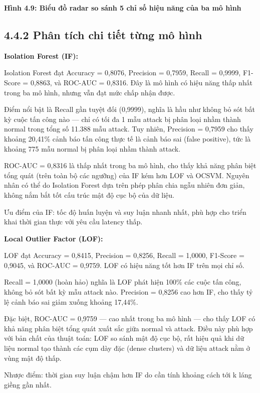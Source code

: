 \documentclass[
  a4paper]{report}
\begin{document}
\textbf{Hình 4.9: Biểu đồ radar so sánh 5 chỉ số hiệu năng của ba mô
hình}

\subsection{4.4.2 Phân tích chi tiết từng mô
hình}\label{phuxe2n-tuxedch-chi-tiux1ebft-tux1eebng-muxf4-huxecnh}

\textbf{Isolation Forest (IF):}

Isolation Forest đạt Accuracy = 0,8076, Precision = 0,7959, Recall =
0,9999, F1-Score = 0,8863, và ROC-AUC = 0,8316. Đây là mô hình có hiệu
năng thấp nhất trong ba mô hình, nhưng vẫn đạt mức chấp nhận được.

Điểm nổi bật là Recall gần tuyệt đối (0,9999), nghĩa là hầu như không bỏ
sót bất kỳ cuộc tấn công nào --- chỉ có tối đa 1 mẫu attack bị phân loại
nhầm thành normal trong tổng số 11.388 mẫu attack. Tuy nhiên, Precision
= 0,7959 cho thấy khoảng 20,41\% cảnh báo tấn công thực tế là cảnh báo
sai (false positive), tức là khoảng 775 mẫu normal bị phân loại nhầm
thành attack.

ROC-AUC = 0,8316 là thấp nhất trong ba mô hình, cho thấy khả năng phân
biệt tổng quát (trên toàn bộ các ngưỡng) của IF kém hơn LOF và OCSVM.
Nguyên nhân có thể do Isolation Forest dựa trên phép phân chia ngẫu
nhiên đơn giản, không nắm bắt tốt cấu trúc mật độ cục bộ của dữ liệu.

Ưu điểm của IF: tốc độ huấn luyện và suy luận nhanh nhất, phù hợp cho
triển khai thời gian thực với yêu cầu latency thấp.

\textbf{Local Outlier Factor (LOF):}

LOF đạt Accuracy = 0,8415, Precision = 0,8256, Recall = 1,0000, F1-Score
= 0,9045, và ROC-AUC = 0,9759. LOF có hiệu năng tốt hơn IF trên mọi chỉ
số.

Recall = 1,0000 (hoàn hảo) nghĩa là LOF phát hiện 100\% các cuộc tấn
công, không bỏ sót bất kỳ mẫu attack nào. Precision = 0,8256 cao hơn IF,
cho thấy tỷ lệ cảnh báo sai giảm xuống khoảng 17,44\%.

Đặc biệt, ROC-AUC = 0,9759 --- cao nhất trong ba mô hình --- cho thấy
LOF có khả năng phân biệt tổng quát xuất sắc giữa normal và attack. Điều
này phù hợp với bản chất của thuật toán: LOF so sánh mật độ cục bộ, rất
hiệu quả khi dữ liệu normal tạo thành các cụm dày đặc (dense clusters)
và dữ liệu attack nằm ở vùng mật độ thấp.

Nhược điểm: thời gian suy luận chậm hơn IF do cần tính khoảng cách tới k
láng giềng gần nhất.
\end{document}
